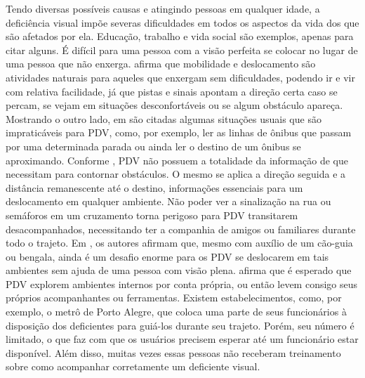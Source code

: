 \documentclass[english,brazilian]{UNISINOSmonografia}
\begin{document}
Tendo diversas possíveis causas e atingindo pessoas em qualquer idade, a deficiência visual impõe severas dificuldades em todos os aspectos da vida dos que são afetados por ela. Educação, trabalho e vida social são exemplos, apenas para citar alguns. É difícil para uma pessoa com a visão perfeita se colocar no lugar de uma pessoa que não enxerga.  afirma que mobilidade e deslocamento são atividades naturais para aqueles que enxergam sem dificuldades, podendo ir e vir com relativa facilidade, já que pistas e sinais apontam a direção certa caso se percam, se vejam em situações desconfortáveis ou se algum obstáculo apareça. Mostrando o outro lado, em  são citadas algumas situações usuais que são impraticáveis para PDV, como, por exemplo, ler as linhas de ônibus que passam por uma determinada parada ou ainda ler o destino de um ônibus se aproximando. Conforme , PDV não possuem a totalidade da informação de que necessitam para contornar obstáculos. O mesmo se aplica a direção seguida e a distância remanescente até o destino, informações essenciais para um deslocamento em qualquer ambiente. Não poder ver a sinalização na rua ou semáforos em um cruzamento torna perigoso para PDV transitarem desacompanhados, necessitando ter a companhia de amigos ou familiares durante todo o trajeto. 
Em , os autores afirmam que, mesmo com auxílio de um cão-guia ou bengala, ainda é um desafio enorme para os PDV se deslocarem em tais ambientes sem ajuda de uma pessoa com visão plena. 
 afirma que é esperado que PDV explorem ambientes internos por conta própria, ou então levem consigo seus próprios acompanhantes ou ferramentas. Existem estabelecimentos, como, por exemplo, o metrô de Porto Alegre, que coloca uma parte de seus funcionários à disposição dos deficientes para guiá-los durante seu trajeto. Porém, seu número é limitado, o que faz com que os usuários precisem esperar até um funcionário estar disponível. Além disso, muitas vezes essas pessoas não receberam treinamento sobre como acompanhar corretamente um deficiente visual.
\end{document}
